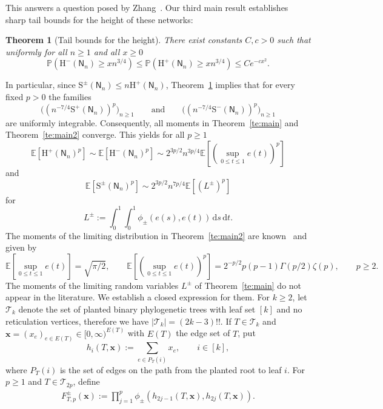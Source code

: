 \documentclass[english,11pt]{smfart}
\newcommand{\Prb}[1]{\mathbb{P}\left(#1\right)}
\newcommand{\Ex}[1]{\mathbb{E}[#1]}
\newcommand{\Exb}[1]{\mathbb{E}\left[#1\right]}
\newcommand{\He}{\mathrm{H}}
\newcommand{\Si}{\mathrm{S}}
\newcommand{\cT}{\mathcal{T}}
\newcommand{\mN}{\mathsf{N}}
\newtheorem{theorem}{Theorem}[section]
\numberwithin{equation}{section}
\begin{document}
This answers a question posed by Zhang~\cite[Sec. 4]{zbMATH07570970}. Our third main result establishes sharp tail bounds for the height of these networks:
\begin{theorem}[Tail bounds for the height]
	\label{te:bound}
	There exist constants $C,c>0$ such that uniformly for all $n\ge 1$ and all $x\ge 0$
	\[
		\Prb{\He^-(\mN_n) \ge x n^{3/4}} \le \Prb{\He^+(\mN_n) \ge x n^{3/4}} \le C e^{-c x^2}.
	\]
\end{theorem}
In particular, since $\Si^\pm(\mN_n)\le n\He^+(\mN_n)$, Theorem~\ref{te:bound} implies that for every fixed $p>0$ the families
\[
	\bigl((n^{-7/4}\Si^+(\mN_n))^p\bigr)_{n\ge 1}
	\qquad\text{and}\qquad
	\bigl((n^{-7/4}\Si^-(\mN_n))^p\bigr)_{n\ge 1}
\]
are uniformly integrable. Consequently, all moments in Theorem~\ref{te:main} and Theorem~\ref{te:main2} converge. This yields for all $p \ge 1$
\[
	\Ex{\He^+(\mN_n)^p} \sim \Ex{\He^-(\mN_n)^p} \sim 2^{3p/2} n^{3p/4} \Exb{ \left(\sup_{0 \le t \le 1} e(t)\right)^p}
\]
and
\[
	\Exb{\Si^\pm(\mN_n)^p} \sim 2^{3p/2} n^{7p/4} \Exb{ (L^\pm)^p}
\]
for
\[
	L^\pm := \int_0^1\int_0^1 \phi_\pm(e(s),e(t))\,\mathrm{d}s\,\mathrm{d}t.
\]
The moments of the limiting distribution in Theorem~\ref{te:main2} are known~\cite{zbMATH01663205} and given by
\[
	\Exb{ \sup_{0 \le t \le 1} e(t)} = \sqrt{\pi/2}, \qquad \Exb{ \left(\sup_{0 \le t \le 1} e(t)\right)^p} = 2^{-p/2} p(p-1)\Gamma(p/2) \zeta(p), \qquad p \ge 2.
\] 
The moments of the limiting random variables $L^\pm$ of Theorem~\ref{te:main} do not appear in the literature. We establish a closed expression for them. For $k \ge 2$, let $\cT_k$ denote the set of planted binary phylogenetic trees with leaf set $[k]$ and no reticulation vertices, therefore we have $|\cT_k|=(2k-3)!!$.  If $T \in \cT_k$ and $\bm{x} = (x_e)_{e\in E(T)} \in [0,\infty)^{E(T)}$ with $E(T)$ the edge set of $T$, put
\[
	h_i(T,\bm x) := \sum_{e\in P_T(i)}x_e, \qquad i\in[k],
\]
where $P_T(i)$ is the set of edges on the path from the planted root to
leaf $i$.  For $p \ge 1$ and $T\in\cT_{2p}$, define
\begin{align*}
	F_{T,p}^\pm(\bm x) := \prod_{j=1}^p \phi_\pm\left(h_{2j-1}(T,\bm x),h_{2j}(T,\bm x)\right).
\end{align*}
\end{document}
